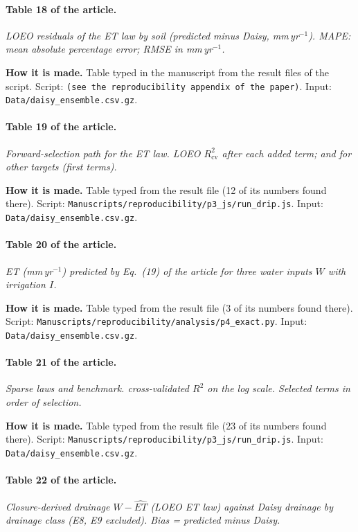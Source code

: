 \paragraph{Table 18 of the article.} \emph{LOEO residuals of the ET law by soil (predicted minus Daisy, mm\,yr$^{-1}$). MAPE: mean absolute percentage error; RMSE in mm\,yr$^{-1}$.}

\textbf{How it is made.} Table typed in the manuscript from the result files of the script. Script: \nolinkurl{(see the reproducibility appendix of the paper)}. Input: \nolinkurl{Data/daisy_ensemble.csv.gz}.

\paragraph{Table 19 of the article.} \emph{Forward-selection path for the ET law. LOEO $R^2_{\mathrm{cv}}$ after each added term; and for other targets (first terms).}

\textbf{How it is made.} Table typed from the result file (12 of its numbers found there). Script: \nolinkurl{Manuscripts/reproducibility/p3_js/run_drip.js}. Input: \nolinkurl{Data/daisy_ensemble.csv.gz}.

\paragraph{Table 20 of the article.} \emph{ET (mm\,yr$^{-1}$) predicted by Eq.~(19) of the article for three water inputs $W$ with irrigation $I$.}

\textbf{How it is made.} Table typed from the result file (3 of its numbers found there). Script: \nolinkurl{Manuscripts/reproducibility/analysis/p4_exact.py}. Input: \nolinkurl{Data/daisy_ensemble.csv.gz}.

\paragraph{Table 21 of the article.} \emph{Sparse laws and benchmark. cross-validated $R^2$ on the log scale. Selected terms in order of selection.}

\textbf{How it is made.} Table typed from the result file (23 of its numbers found there). Script: \nolinkurl{Manuscripts/reproducibility/p3_js/run_drip.js}. Input: \nolinkurl{Data/daisy_ensemble.csv.gz}.

\paragraph{Table 22 of the article.} \emph{Closure-derived drainage $W-\widehat{\mathit{ET}}$ (LOEO ET law) against Daisy drainage by drainage class (E8, E9 excluded). Bias = predicted minus Daisy.}

